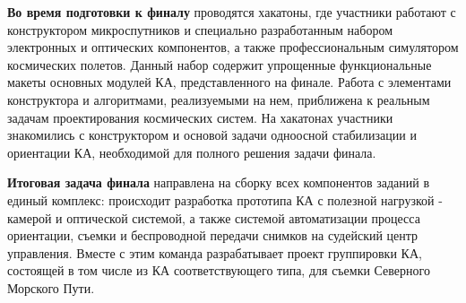 \textbf{Во время подготовки к финалу} проводятся хакатоны, где участники работают с конструктором микроспутников и специально разработанным набором электронных и оптических компонентов, а также профессиональным симулятором космических полетов. Данный набор содержит упрощенные функциональные макеты основных модулей КА, представленного на финале. Работа с элементами конструктора и алгоритмами, реализуемыми на нем, приближена к реальным задачам проектирования космических систем. На хакатонах участники знакомились с конструктором и основой задачи одноосной стабилизации и ориентации КА, необходимой для полного решения задачи финала. 

\textbf{Итоговая задача финала} направлена на сборку всех компонентов заданий в единый комплекс: происходит разработка прототипа КА с полезной нагрузкой - камерой и оптической системой, а также системой автоматизации процесса ориентации, съемки и беспроводной передачи снимков на судейский центр управления. Вместе с этим команда разрабатывает проект группировки КА, состоящей в том числе из КА соответствующего типа, для съемки Северного Морского Пути.